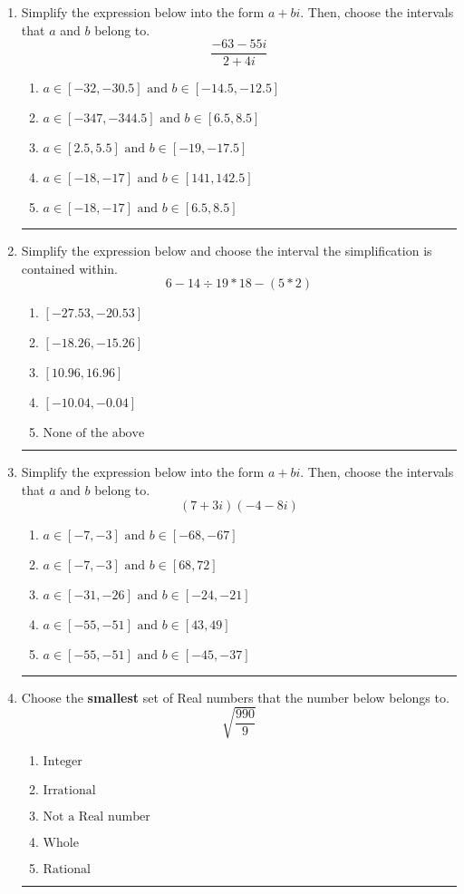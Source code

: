 \documentclass[14pt]{extbook}
\newcommand{\litem}[1]{\item#1\hspace*{-1cm}\rule{\textwidth}{0.4pt}}
\begin{document}
\begin{enumerate}
{\begin{enumerate}[label=\Alph*.]
\end{enumerate} }
\litem{
Simplify the expression below into the form $a+bi$. Then, choose the intervals that $a$ and $b$ belong to.\[ \frac{-63 - 55 i}{2 + 4 i} \]\begin{enumerate}[label=\Alph*.]
\item \( a \in [-32, -30.5] \text{ and } b \in [-14.5, -12.5] \)
\item \( a \in [-347, -344.5] \text{ and } b \in [6.5, 8.5] \)
\item \( a \in [2.5, 5.5] \text{ and } b \in [-19, -17.5] \)
\item \( a \in [-18, -17] \text{ and } b \in [141, 142.5] \)
\item \( a \in [-18, -17] \text{ and } b \in [6.5, 8.5] \)

\end{enumerate} }
\litem{
Simplify the expression below and choose the interval the simplification is contained within.\[ 6 - 14 \div 19 * 18 - (5 * 2) \]\begin{enumerate}[label=\Alph*.]
\item \( [-27.53, -20.53] \)
\item \( [-18.26, -15.26] \)
\item \( [10.96, 16.96] \)
\item \( [-10.04, -0.04] \)
\item \( \text{None of the above} \)

\end{enumerate} }
\litem{
Simplify the expression below into the form $a+bi$. Then, choose the intervals that $a$ and $b$ belong to.\[ (7 + 3 i)(-4 - 8 i) \]\begin{enumerate}[label=\Alph*.]
\item \( a \in [-7, -3] \text{ and } b \in [-68, -67] \)
\item \( a \in [-7, -3] \text{ and } b \in [68, 72] \)
\item \( a \in [-31, -26] \text{ and } b \in [-24, -21] \)
\item \( a \in [-55, -51] \text{ and } b \in [43, 49] \)
\item \( a \in [-55, -51] \text{ and } b \in [-45, -37] \)

\end{enumerate} }
\litem{
Choose the \textbf{smallest} set of Real numbers that the number below belongs to.\[ \sqrt{\frac{990}{9}} \]\begin{enumerate}[label=\Alph*.]
\item \( \text{Integer} \)
\item \( \text{Irrational} \)
\item \( \text{Not a Real number} \)
\item \( \text{Whole} \)
\item \( \text{Rational} \)


\end{enumerate}}
\end{enumerate}
\end{document}
